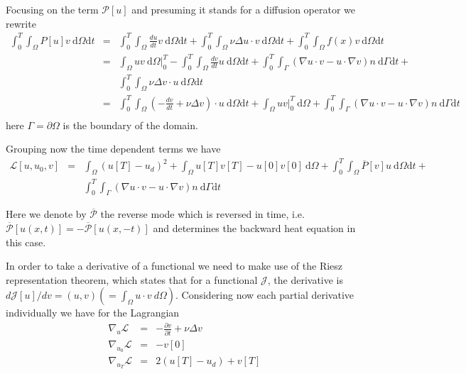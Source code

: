\documentclass[10pt]{article}
\renewcommand{\d}{\mathrm{d}}
\begin{document}

Focusing on the term $\mathcal P[u]$ and presuming it stands for a diffusion operator we rewrite
\begin{eqnarray}
\int_0^T\int_{\Omega} P[u]  v \ \d \Omega \d t &=&
\int_0^T\int_{\Omega} \frac{d u}{d t}  v \ \d \Omega \d t+ \int_0^T\int_{\Omega} \nu\Delta  u \cdot  v \ \d \Omega \d t+\int_0^T\int_{\Omega}  f( x)   v \ \d \Omega \d t \\ \nonumber
&=& \int_{\Omega} u v \ \d \Omega|_0^T -
\int_0^T\int_{\Omega}
 \frac{d v}{d t}  u \ \d \Omega \d t+ \int_0^T\int_{\Gamma}(\nabla  u\cdot  v-  u\cdot \nabla v) n\ \d \Gamma \d t + \\ \nonumber
 && \int_0^T\int_{\Omega} \nu\Delta  v\cdot   u \ \d \Omega \d t \\ \nonumber
 &=& 
\int_0^T\int_{\Omega}
(- \frac{d v}{d t}  +\nu\Delta  v)\cdot   u\ \d \Omega \d t+\int_{\Omega} u v |_0^T \ \d \Omega
+ \int_0^T\int_{\Gamma}(\nabla  u\cdot  v-  u\cdot \nabla v) n\ \d \Gamma \d t \\ \nonumber
\end{eqnarray}
here $\Gamma=\partial \Omega$ is the boundary of the domain.

Grouping now the time dependent terms we have
\begin{eqnarray}
\mathcal{L}[ u, u_0,v]&=&\int_{\Omega}( u[T]- u_d)^2 + \int_{\Omega} u[T] v[T] - u[0] v[0]\ \d \Omega+\int_0^T\int_{\Omega} \overline{P}[ v]  u \ \d \Omega \d t + \\ \nonumber
 && \int_0^T\int_{\Gamma}(\nabla  u\cdot  v-  u\cdot \nabla v) n\ \d \Gamma \d t
\end{eqnarray}

Here we denote by $\overline{\mathcal P}$ the reverse mode which is reversed in time, i.e. $\overline{\mathcal P}[u(x,t)]=-\overline{\mathcal P}[u(x,-t)]$ and determines the backward heat equation in this case. 

In order to take a derivative of a functional we need to make use of the Riesz representation theorem, which states that for a functional $\mathcal J$, the derivative is $d \mathcal J[u]/dv=(u,v)(=\int_{\Omega} u\cdot v \ d \Omega)$. Considering now each partial derivative individually we have for the Lagrangian
\begin{eqnarray}
\nabla_u \mathcal L&=&- \frac{\partial v}{\partial t}  +\nu\Delta  v \\ \nonumber
\nabla_{u_0} \mathcal L&=&- v[0]\\ \nonumber
\nabla_{u_T} \mathcal L&=&2( u[T]- u_d)+ v[T]\\ \nonumber
\label{eq:bcs_ics}
\end{eqnarray}
\end{document}
